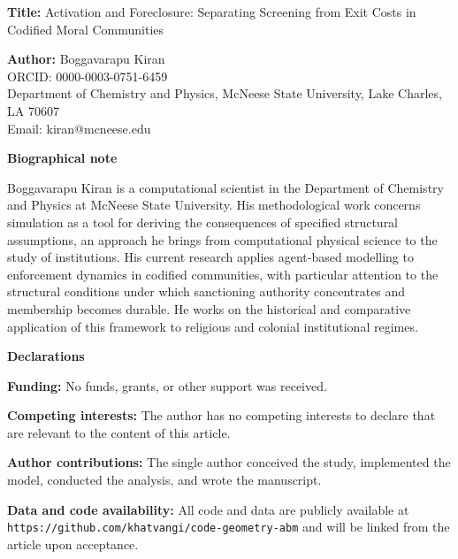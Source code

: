 \documentclass[12pt]{article}
\begin{document}
\noindent\textbf{Title:} Activation and Foreclosure: Separating Screening from Exit Costs in Codified Moral Communities

\vspace{1em}
\noindent\textbf{Author:} Boggavarapu Kiran\\
ORCID: 0000-0003-0751-6459\\
Department of Chemistry and Physics, McNeese State University, Lake Charles, LA 70607\\
Email: kiran@mcneese.edu

\vspace{1em}
\noindent\textbf{Biographical note}

\noindent Boggavarapu Kiran is a computational scientist in the Department of Chemistry and Physics at McNeese State University. His methodological work concerns simulation as a tool for deriving the consequences of specified structural assumptions, an approach he brings from computational physical science to the study of institutions. His current research applies agent-based modelling to enforcement dynamics in codified communities, with particular attention to the structural conditions under which sanctioning authority concentrates and membership becomes durable. He works on the historical and comparative application of this framework to religious and colonial institutional regimes.

\vspace{1em}
\noindent\textbf{Declarations}

\vspace{0.5em}
\noindent\textbf{Funding:} No funds, grants, or other support was received.

\noindent\textbf{Competing interests:} The author has no competing interests to declare that are relevant to the content of this article.

\noindent\textbf{Author contributions:} The single author conceived the study, implemented the model, conducted the analysis, and wrote the manuscript.

\noindent\textbf{Data and code availability:} All code and data are publicly available at \texttt{https://github.com/khatvangi/code-geometry-abm} and will be linked from the article upon acceptance.
\end{document}
